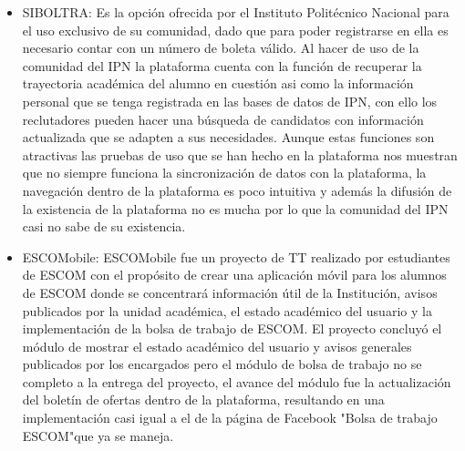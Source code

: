 \begin{itemize}
    \item SIBOLTRA: Es la opción ofrecida por el Instituto Politécnico Nacional para el uso exclusivo de su comunidad, dado que 
    para poder registrarse en ella es necesario contar con un número de boleta válido. Al hacer de uso de la comunidad del IPN la 
    plataforma cuenta con la función de recuperar la trayectoria académica del alumno en cuestión asi como la información personal 
    que se tenga registrada en las bases de datos de IPN, con ello los reclutadores pueden hacer una búsqueda de candidatos con 
    información actualizada que se adapten a sus necesidades. Aunque estas funciones son atractivas las pruebas de uso que se han 
    hecho en la plataforma nos muestran que no siempre funciona la sincronización de datos con la plataforma, la navegación dentro 
    de la plataforma es poco intuitiva y además la difusión de la existencia de la plataforma no es mucha por lo que la comunidad 
    del IPN casi no sabe de su existencia. 
    
    \item ESCOMobile: ESCOMobile fue un proyecto de TT realizado por estudiantes de ESCOM con el propósito de crear una aplicación 
    móvil para los alumnos de ESCOM donde se concentrará información útil de la Institución, avisos publicados por la unidad 
    académica, el estado académico del usuario y la implementación de la bolsa de trabajo de ESCOM. El proyecto concluyó el módulo 
    de mostrar el estado académico del usuario y avisos generales publicados por los encargados pero el módulo de bolsa de trabajo 
    no se completo a la entrega del proyecto, el avance del módulo fue la actualización del boletín de ofertas dentro de la 
    plataforma, resultando en una implementación casi igual a el de la página de Facebook "Bolsa de trabajo ESCOM"que ya se maneja.

\end{itemize}

